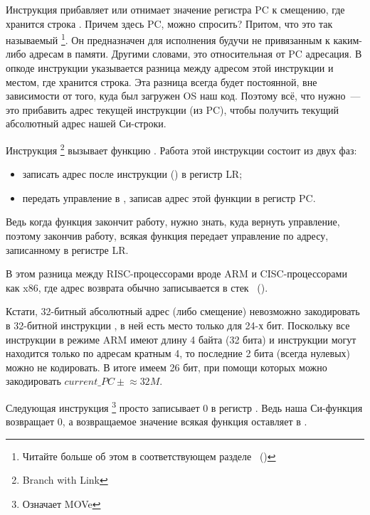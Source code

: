 \index{\PICcode}
Инструкция  прибавляет или отнимает значение регистра \ac{PC} к смещению, где хранится строка
.
Причем здесь \ac{PC}, можно спросить? Притом, что это так называемый \q{\PICcode}
\footnote{Читайте больше об этом в соответствующем разделе ~()}.
Он предназначен для исполнения будучи не привязанным к каким-либо адресам в памяти.
Другими словами, это относительная от \ac{PC} адресация.
В опкоде инструкции  указывается разница между адресом этой инструкции и местом, где хранится строка.
Эта разница всегда будет постоянной, вне зависимости от того, куда был загружен \ac{OS} наш код.
Поэтому всё, что нужно~--- это прибавить адрес текущей инструкции (из \ac{PC}), чтобы получить текущий абсолютный адрес нашей Си-строки.

Инструкция \footnote{Branch with Link} вызывает функцию \printf.
Работа этой инструкции состоит из двух фаз:

\begin{itemize}
\item записать адрес после инструкции  () в регистр \ac{LR};
\item передать управление в \printf, записав адрес этой функции в регистр \ac{PC}.
\end{itemize}

Ведь когда функция \printf закончит работу, нужно знать, куда вернуть управление, поэтому закончив работу, всякая функция передает управление по адресу, записанному в регистре \ac{LR}.

В этом разница между  \ac{RISC}-процессорами вроде ARM и \ac{CISC}-процессорами как x86,
где адрес возврата обычно записывается в стек ~().

Кстати, 32-битный абсолютный адрес (либо смещение) невозможно закодировать в 32-битной инструкции , в ней есть место только для 24-х бит.
Поскольку все инструкции в режиме ARM имеют длину 4 байта (32 бита) и инструкции могут находится только по адресам кратным 4, то последние 2 бита (всегда нулевых) можно не кодировать.
В итоге имеем 26 бит, при помощи которых можно закодировать $current\_PC \pm{} \approx{}32M$.

Следующая инструкция \footnote{Означает MOVe}
просто записывает 0 в регистр .
Ведь наша Си-функция возвращает 0, а возвращаемое значение всякая функция оставляет в .

